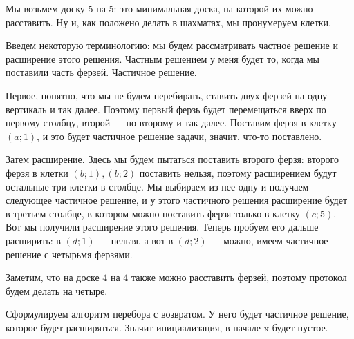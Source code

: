 \documentclass[russian]{lecture-notes}
\theoremstyle{definition}
\begin{document}
		\begin{example*}
		
		Мы возьмем доску 5 на 5: это минимальная доска, на которой их можно расставить. Ну и, как положено делать в шахматах, мы пронумеруем клетки. 
		
		\begin{figure} [H]
		\centering
		\end{figure}
		
		Введем некоторую терминологию: мы будем рассматривать частное решение и расширение этого решения.  Частным решением у меня будет то, когда мы поставили часть ферзей. Частичное решение.
		
		Первое, понятно, что мы не будем перебирать, ставить двух ферзей на одну вертикаль и так далее. Поэтому первый ферзь будет перемещаться вверх по первому столбцу, второй --- по второму и так далее. Поставим ферзя в клетку $(a;1)$, и это будет частичное решение задачи, значит, что-то поставлено.
		
		Затем расширение. Здесь мы будем пытаться поставить второго ферзя: второго ферзя в клетки $(b;1), (b;2)$ поставить нельзя, поэтому расширением будут остальные три клетки в столбце. Мы выбираем из нее одну и получаем следующее частичное решение, и у этого частичного решения расширение будет в третьем столбце, в котором можно поставить ферзя только в клетку $(c;5)$. Вот мы получили расширение этого решения. Теперь пробуем его дальше расширить: в $(d;1)$ --- нельзя, а вот в $(d;2)$ --- можно, имеем частичное решение с четырьмя ферзями. 
		
		Заметим, что на доске 4 на 4 также можно расставить ферзей, поэтому протокол будем делать на четыре.
		
		Сформулируем алгоритм перебора с возвратом. У него будет частичное решение, которое будет расширяться. Значит инициализация, в начале x будет пустое.
		

\end{example*}
\end{document}

